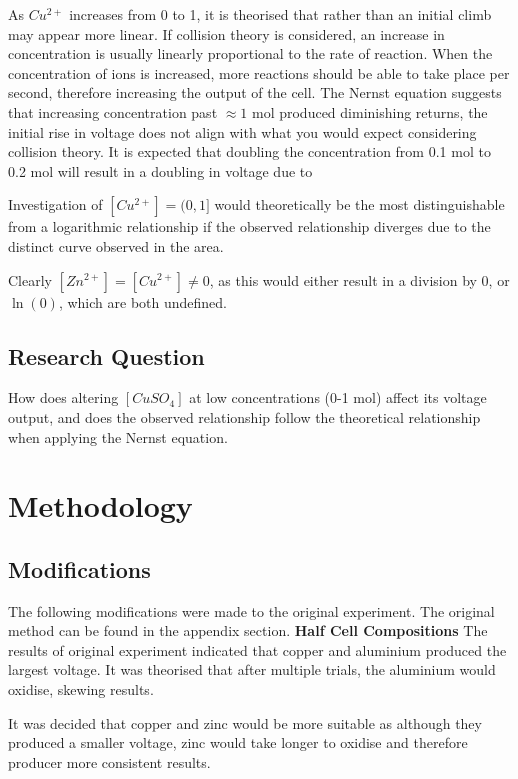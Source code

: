 \documentclass[11pt,a4paper]{article}
\begin{document}
As $Cu^{2+}$ increases from 0 to 1, it is theorised that rather than an initial climb may appear more linear. If collision theory is considered, an increase in concentration is usually linearly proportional to the rate of reaction. When the concentration of ions is increased, more reactions should be able to take place per second, therefore increasing the output of the cell. The Nernst equation suggests that increasing concentration past $\approx 1$ mol produced diminishing returns, the initial rise in voltage does not align with what you would expect considering collision theory. It is expected that doubling the concentration from 0.1 mol to 0.2 mol will result in a doubling in voltage due to 

Investigation of $[Cu^{2+}]=(0, 1]$ would theoretically be the most distinguishable from a logarithmic relationship if the observed relationship diverges due to the distinct curve observed in the area.



Clearly $[Zn^{2+}]=[Cu^{2+}]\neq 0$, as this would either result in a division by 0, or $\ln(0)$, which are both undefined. 

\subsection{Research Question}
How does altering $[CuSO_4]$ at low concentrations (0-1 mol) affect its voltage output, and does the observed relationship follow the theoretical relationship when applying the Nernst equation.
\section{Methodology}
\subsection{Modifications}

The following modifications were made to the original experiment. The original method can be found in the appendix section.\newline
\textbf{Half Cell Compositions}\newline
The results of original experiment indicated that copper and aluminium produced the largest voltage. It was theorised that after multiple trials, the aluminium would oxidise, skewing results.

It was decided that copper and zinc would be more suitable as although they produced a smaller voltage, zinc would take longer to oxidise and therefore producer more consistent results.
\end{document}
